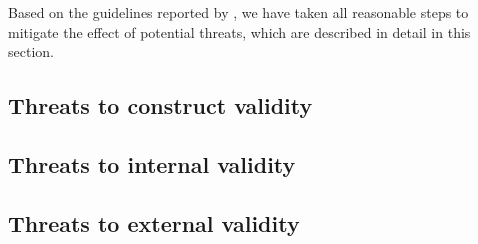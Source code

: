 Based on the guidelines reported by \citet{wohlin2012experimentation}, we have
taken all reasonable steps to mitigate the effect of potential threats, which
are described in detail in this section.

\subsection{Threats to construct validity}
%

\subsection{Threats to internal validity}
%

\subsection{Threats to external validity}
%

